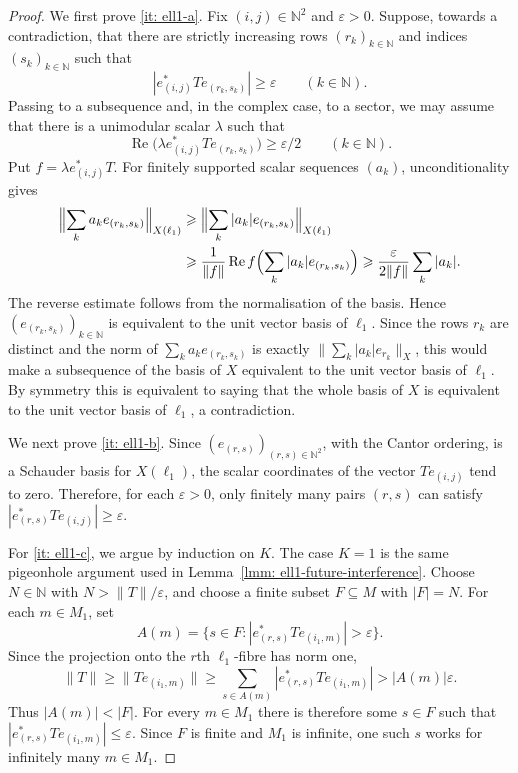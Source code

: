 \documentclass[11pt]{amsart}
\theoremstyle{plain}
\theoremstyle{definition}
\numberwithin{equation}{section}
\newcommand{\N}{\mathbb{N}}
\renewcommand{\leq}{\leqslant}
\renewcommand{\geq}{\geqslant}
\begin{document}
\begin{proof}
    We first prove \ref{it: ell1-a}. Fix $(i,j) \in \N^2$ and $\varepsilon > 0$. Suppose, towards a contradiction, that there are strictly increasing rows $(r_k)_{k\in\N}$ and indices $(s_k)_{k\in\N}$ such that
    \begin{equation*}
        |e^*_{(i,j)}T e_{(r_k,s_k)}| \geq \varepsilon
        \qquad (k\in\N).
    \end{equation*}
    Passing to a subsequence and, in the complex case, to a sector, we may assume that there is a unimodular scalar $\lambda$ such that
    \begin{equation*}
        \operatorname{Re}\bigl(\lambda e^*_{(i,j)}T e_{(r_k,s_k)}\bigr)\geq \varepsilon/2
        \qquad (k\in\N).
    \end{equation*}
    Put $f=\lambda e^*_{(i,j)}T$. For finitely supported scalar sequences $(a_k)$, unconditionality gives
    \begin{align*}
        \Bigl\| \sum_k a_k e_{(r_k,s_k)}\Bigr\|_{X(\ell_1)}
        &\geq \Bigl\| \sum_k |a_k| e_{(r_k,s_k)}\Bigr\|_{X(\ell_1)} \\
        &\geq \frac{1}{\|f\|}
        \operatorname{Re} f\Bigl(\sum_k |a_k|e_{(r_k,s_k)}\Bigr)
        \geq \frac{\varepsilon}{2\|f\|}\sum_k |a_k|.
    \end{align*}
    The reverse estimate follows from the normalisation of the basis. Hence $(e_{(r_k,s_k)})_{k\in\N}$ is equivalent to the unit vector basis of $\ell_1$. Since the rows $r_k$ are distinct and the norm of $\sum_k a_k e_{(r_k,s_k)}$ is exactly $\|\sum_k |a_k|e_{r_k}\|_X$, this would make a subsequence of the basis of $X$ equivalent to the unit vector basis of $\ell_1$. By symmetry this is equivalent to saying that the whole basis of $X$ is equivalent to the unit vector basis of $\ell_1$, a contradiction.

    We next prove \ref{it: ell1-b}. Since $(e_{(r,s)})_{(r,s)\in\N^2}$, with the Cantor ordering, is a Schauder basis for $X(\ell_1)$, the scalar coordinates of the vector $T e_{(i,j)}$ tend to zero. Therefore, for each $\varepsilon>0$, only finitely many pairs $(r,s)$ can satisfy $|e^*_{(r,s)}T e_{(i,j)}|\geq \varepsilon$.

    For \ref{it: ell1-c}, we argue by induction on $K$. The case $K=1$ is the same pigeonhole argument used in Lemma~\ref{lmm: ell1-future-interference}. Choose $N \in \N$ with $N > \|T\|/\varepsilon$, and choose a finite subset $F \subseteq M$ with $|F|=N$. For each $m\in M_1$, set
    \begin{equation*}
        A(m)=\{s\in F: |e_{(r,s)}^*T e_{(i_1,m)}|>\varepsilon\}.
    \end{equation*}
    Since the projection onto the $r$th $\ell_1$-fibre has norm one,
    \begin{equation*}
        \|T\|
        \geq \|T e_{(i_1,m)}\|
        \geq \sum_{s\in A(m)} |e_{(r,s)}^*T e_{(i_1,m)}|
        > |A(m)|\varepsilon.
    \end{equation*}
    Thus $|A(m)|<|F|$. For every $m\in M_1$ there is therefore some $s\in F$ such that $|e_{(r,s)}^*T e_{(i_1,m)}|\leq\varepsilon$. Since $F$ is finite and $M_1$ is infinite, one such $s$ works for infinitely many $m\in M_1$.


\end{proof}
\end{document}
